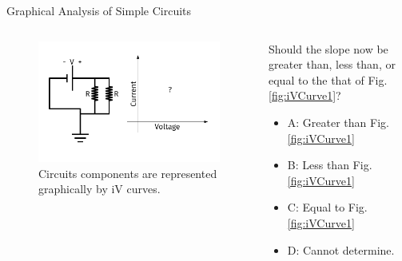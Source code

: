 \documentclass{beamer}
\begin{document}
\begin{frame}{Graphical Analysis of Simple Circuits}
\begin{columns}[T]
\begin{column}{0.5\textwidth}
\begin{figure}
\centering
\includegraphics[width=\textwidth,trim=0.5cm 0cm 1cm 0cm,clip=true]{figures/iVCurve3.pdf}
\caption{\label{fig:iVCurve3} Circuits components are represented graphically by iV curves.}
\end{figure}
\end{column}
\begin{column}{0.5\textwidth}
\small
Should the slope now be greater than, less than, or equal to the that of Fig. \ref{fig:iVCurve1}?
\begin{itemize}
\item A: Greater than Fig. \ref{fig:iVCurve1}
\item B: Less than Fig. \ref{fig:iVCurve1}
\item C: Equal to Fig. \ref{fig:iVCurve1}
\item D: Cannot determine.
\end{itemize}
\end{column}
\end{columns}
\end{frame}
\end{document}
